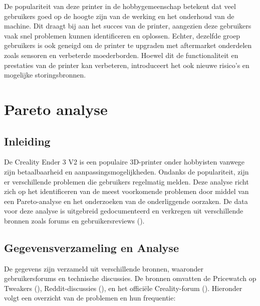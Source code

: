 \documentclass{article}
\begin{document}
De populariteit van deze printer in de hobbygemeenschap betekent dat veel gebruikers goed op de hoogte zijn van de werking en het onderhoud van de machine. Dit draagt bij aan het succes van de printer, aangezien deze gebruikers vaak snel problemen kunnen identificeren en oplossen. Echter, dezelfde groep gebruikers is ook geneigd om de printer te upgraden met aftermarket onderdelen zoals sensoren en verbeterde moederborden. Hoewel dit de functionaliteit en prestaties van de printer kan verbeteren, introduceert het ook nieuwe risico's en mogelijke storingsbronnen.




\newpage
\section{Pareto analyse}

\subsection{Inleiding}
De Creality Ender 3 V2 is een populaire 3D-printer onder hobbyisten vanwege zijn betaalbaarheid en aanpassingsmogelijkheden. Ondanks de populariteit, zijn er verschillende problemen die gebruikers regelmatig melden. Deze analyse richt zich op het identificeren van de meest voorkomende problemen door middel van een Pareto-analyse en het onderzoeken van de onderliggende oorzaken. De data voor deze analyse is uitgebreid gedocumenteerd en verkregen uit verschillende bronnen zoals forums en gebruikersreviews ().

\subsection{Gegevensverzameling en Analyse}
De gegevens zijn verzameld uit verschillende bronnen, waaronder gebruikersforums en technische discussies. De bronnen omvatten de Pricewatch op Tweakers (), Reddit-discussies (), en het officiële Creality-forum (). Hieronder volgt een overzicht van de problemen en hun frequentie:
\end{document}
